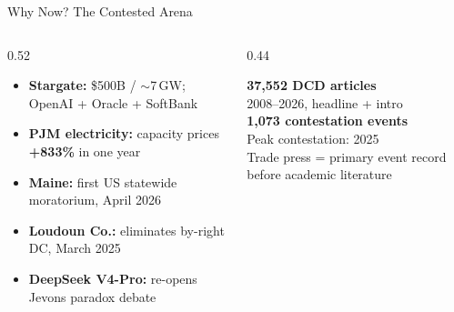\documentclass[aspectratio=169,11pt]{beamer}
\newcommand{\iconfull}[2]{\textcolor{#1}{\faIcon{#2}}}
\newcommand{\hl}[1]{\textcolor{dchighlight}{\textbf{#1}}}
\begin{document}
\begin{frame}{\iconfull{dcblue}{fire}\enspace Why Now? The Contested Arena}
\begin{columns}[T]
\begin{column}{0.52\textwidth}
  \footnotesize
  \begin{itemize}\setlength\itemsep{0.4em}
    \item \textbf{Stargate:} \$500B / ${\sim}$7\,GW; OpenAI + Oracle + SoftBank
    \item \textbf{PJM electricity:} capacity prices \hl{+833\%} in one year
    \item \textbf{Maine:} first US statewide moratorium, April 2026
    \item \textbf{Loudoun Co.:} eliminates by-right DC, March 2025
    \item \textbf{DeepSeek V4-Pro:} re-opens Jevons paradox debate
  \end{itemize}
\end{column}
\begin{column}{0.44\textwidth}
  \vspace{0.4em}
  \begin{block}{}
    \footnotesize
    \hl{37,552 DCD articles}\\[2pt]
    2008--2026, headline + intro\\[2pt]
    \textbf{1,073 contestation events}\\[2pt]
    Peak contestation: 2025\\[4pt]
    \textcolor{dcgray}{\scriptsize Trade press = primary event record before academic literature}
  \end{block}
\end{column}
\end{columns}
\end{frame}
\end{document}
